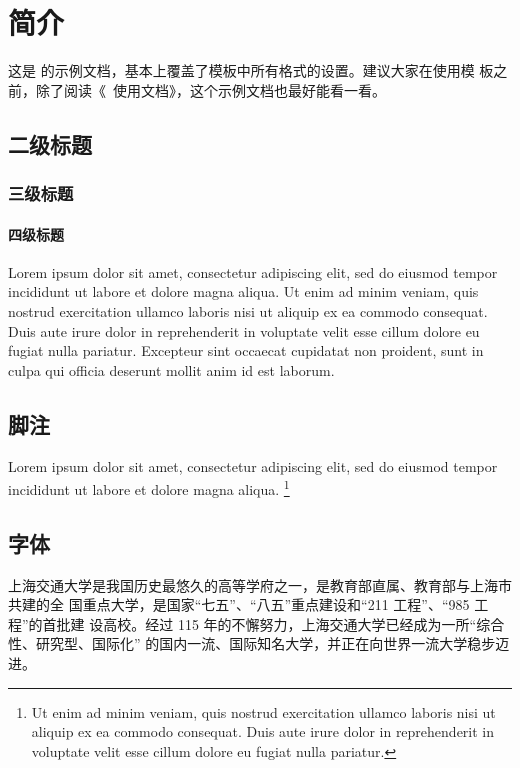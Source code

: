 
\chapter{简介}

这是 \sjtuthesis 的示例文档，基本上覆盖了模板中所有格式的设置。建议大家在使用模
板之前，除了阅读《\sjtuthesis\ 使用文档》，这个示例文档也最好能看一看。

\section{二级标题}

\subsection{三级标题}

\subsubsection{四级标题}

Lorem ipsum dolor sit amet, consectetur adipiscing elit, sed do eiusmod tempor
incididunt ut labore et dolore magna aliqua. Ut enim ad minim veniam, quis
nostrud exercitation ullamco laboris nisi ut aliquip ex ea commodo consequat.
Duis aute irure dolor in reprehenderit in voluptate velit esse cillum dolore eu
fugiat nulla pariatur. Excepteur sint occaecat cupidatat non proident, sunt in
culpa qui officia deserunt mollit anim id est laborum.

\section{脚注}

Lorem ipsum dolor sit amet, consectetur adipiscing elit, sed do eiusmod tempor
incididunt ut labore et dolore magna aliqua. \footnote{Ut enim ad minim veniam,
quis nostrud exercitation ullamco laboris nisi ut aliquip ex ea commodo
consequat. Duis aute irure dolor in reprehenderit in voluptate velit esse cillum
dolore eu fugiat nulla pariatur.}

\section{字体}


上海交通大学是我国历史最悠久的高等学府之一，是教育部直属、教育部与上海市共建的全
国重点大学，是国家“七五”、“八五”重点建设和“211 工程”、“985 工程”的首批建
设高校。经过 115 年的不懈努力，上海交通大学已经成为一所“综合性、研究型、国际化”
的国内一流、国际知名大学，并正在向世界一流大学稳步迈进。 

